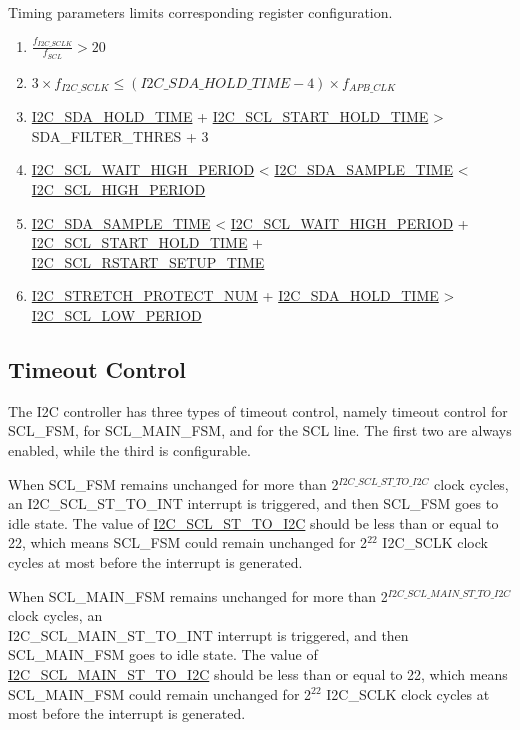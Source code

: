 \documentclass[main\_\_EN.tex]{subfiles}
\begin{document}
Timing parameters limits corresponding register configuration.
\begin{enumerate}
\item $\frac{f_{I2C\_SCLK}}{f_{SCL}} > 20$
\item $3 \times f_{I2C\_SCLK} \leq (\hyperref[fielddesc:I2CSDAHOLDTIME]{I2C\_SDA\_HOLD\_TIME}-4) \times f_{APB\_CLK}$
\item \hyperref[fielddesc:I2CSDAHOLDTIME]{I2C\_SDA\_HOLD\_TIME} + \hyperref[fielddesc:I2CSCLSTARTHOLDTIME]{I2C\_SCL\_START\_HOLD\_TIME} > SDA\_FILTER\_THRES + 3
\item \hyperref[fielddesc:I2CSCLWAITHIGHPERIOD]{I2C\_SCL\_WAIT\_HIGH\_PERIOD} < \hyperref[fielddesc:I2CSDASAMPLETIME]{I2C\_SDA\_SAMPLE\_TIME} < \hyperref[fielddesc:I2CSCLHIGHPERIOD]{I2C\_SCL\_HIGH\_PERIOD}
\item \hyperref[fielddesc:I2CSDASAMPLETIME]{I2C\_SDA\_SAMPLE\_TIME} < \hyperref[fielddesc:I2CSCLWAITHIGHPERIOD]{I2C\_SCL\_WAIT\_HIGH\_PERIOD} + \hyperref[fielddesc:I2CSCLSTARTHOLDTIME]{I2C\_SCL\_START\_HOLD\_TIME} + \\\hyperref[fielddesc:I2CSCLRSTARTSETUPTIME]{I2C\_SCL\_RSTART\_SETUP\_TIME}
\item \hyperref[fielddesc:I2CSTRETCHPROTECTNUM]{I2C\_STRETCH\_PROTECT\_NUM} + \hyperref[fielddesc:I2CSDAHOLDTIME]{I2C\_SDA\_HOLD\_TIME} > \hyperref[fielddesc:I2CSCLLOWPERIOD]{I2C\_SCL\_LOW\_PERIOD}
\end{enumerate}

\subsection{Timeout Control}
The I2C controller has three types of timeout control, namely timeout control for SCL\_FSM, for SCL\_MAIN\_FSM, and for the SCL line. The first two are always enabled, while the third is configurable.

When SCL\_FSM remains unchanged for more than 2$^{\hyperref[fielddesc:I2CSCLSTTOI2C]{I2C\_SCL\_ST\_TO\_I2C}}$  clock cycles, an I2C\_SCL\_ST\_TO\_INT interrupt is triggered, and then SCL\_FSM goes to idle state. The value of \hyperref[fielddesc:I2CSCLSTTOI2C]{I2C\_SCL\_ST\_TO\_I2C} should be less than or equal to 22, which means SCL\_FSM could remain unchanged for 2$^{22}$ I2C\_SCLK clock cycles at most before the interrupt is generated.

When SCL\_MAIN\_FSM remains unchanged for more than 2$^{\hyperref[fielddesc:I2CSCLMAINSTTOI2C]{I2C\_SCL\_MAIN\_ST\_TO\_I2C}}$ clock cycles, an \\I2C\_SCL\_MAIN\_ST\_TO\_INT interrupt is triggered, and then SCL\_MAIN\_FSM goes to idle state. The value of \hyperref[fielddesc:I2CSCLMAINSTTOI2C]{I2C\_SCL\_MAIN\_ST\_TO\_I2C} should be less than or equal to 22, which means SCL\_MAIN\_FSM could remain unchanged for 2$^{22}$ I2C\_SCLK clock cycles at most before the interrupt is generated.
\end{document}
